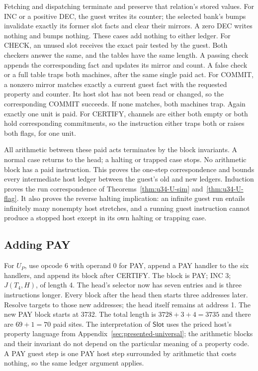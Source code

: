 \documentclass[11pt,twoside]{article}
\theoremstyle{thielethm}
\theoremstyle{thieledef}
\theoremstyle{thieledef}
\theoremstyle{thieledef}
\theoremstyle{thielethm}
\theoremstyle{thieleobs}
\theoremstyle{thielethm}
\begin{document}
Fetching and dispatching terminate and preserve that relation's stored values.
For INC or a positive DEC, the guest writes its counter; the selected bank's bumps
invalidate exactly its former slot facts and clear their mirrors. A zero DEC writes
nothing and bumps nothing. These cases add nothing to either ledger.
For CHECK, an unused slot receives the exact pair tested by the guest. Both checkers
answer the same, and the tables have the same length. A passing check appends the
corresponding fact and updates its mirror and count. A false check or a full table
traps both machines, after the same single paid act. For COMMIT, a nonzero mirror
matches exactly a current guest fact with the requested property and counter. Its
host slot has not been read or changed, so the corresponding COMMIT succeeds.
If none matches, both machines trap. Again exactly one unit is paid. For CERTIFY,
channels are either both empty or both hold corresponding commitments, so the
instruction either traps both or raises both flags, for one unit.

All arithmetic between these paid acts terminates by the block invariants. A normal
case returns to the head; a halting or trapped case stops. No arithmetic block has a
paid instruction. This proves the one-step correspondence and bounds every
intermediate host ledger between the guest's old and new ledgers. Induction proves
the run correspondence of Theorems~\ref{thm:u34-U-sim} and~\ref{thm:u34-U-flag}.
It also proves the reverse halting implication: an infinite guest run entails
infinitely many nonempty host stretches, and a running guest instruction cannot
produce a stopped host except in its own halting or trapping case.

\subsection{Adding PAY}

For $U_P$, use opcode 6 with operand 0 for PAY, append a PAY handler to the six handlers,
and append its block after CERTIFY. The block is PAY; INC 3; $J(T_4,H)$, of length 4.
The head's selector now has seven entries and is three instructions longer. Every
block after the head then starts three addresses later. Resolve targets to those
new addresses; the head itself remains at address 1.
The new PAY block starts at 3732. The total length is $3728+3+4=3735$ and there
are $69+1=70$ paid sites. The interpretation of $\mathsf{Slot}$ uses the priced
host's property language from Appendix~\ref{sec:presented-universal}; the arithmetic
blocks and their invariant do not depend on the particular meaning of a property code.
A PAY guest step is one PAY host step surrounded by arithmetic that costs nothing, so the
same ledger argument applies.
\end{document}
